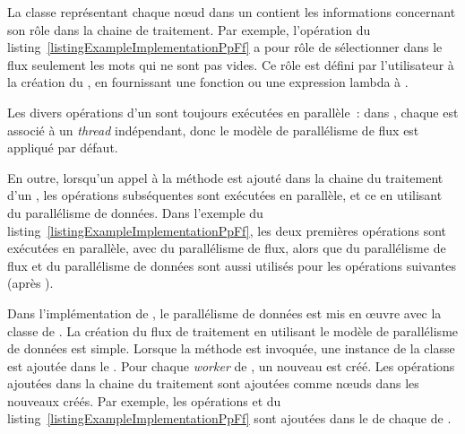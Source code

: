 La classe repr\'esentant chaque nœud dans un  contient les informations concernant son r\^ole dans la chaine de traitement. Par exemple, l'op\'eration  du listing~\ref{listingExampleImplementationPpFf} a pour r\^ole de s\'electionner dans le flux seulement les mots qui ne sont pas vides. Ce r\^ole est d\'efini par l'utilisateur \`a la cr\'eation du , en fournissant une fonction ou une expression lambda \`a .


Les divers op\'erations d'un  sont toujours ex\'ecut\'ees en parall\`ele~: dans , chaque  est associ\'e \`a un \emph{thread} ind\'ependant, donc le mod\`ele de parall\'elisme de flux est appliqu\'e par d\'efaut. 

En outre, lorsqu'un appel \`a la m\'ethode  est ajout\'e dans la chaine du traitement d'un , les op\'erations subs\'equentes sont ex\'ecut\'ees en parall\`ele, et ce en utilisant du parall\'elisme de donn\'ees. Dans l'exemple du listing~\ref{listingExampleImplementationPpFf}, les deux premi\`eres op\'erations sont ex\'ecut\'ees en parall\`ele, avec du parall\'elisme de flux, alors que du parall\'elisme de flux et du parall\'elisme de donn\'ees sont aussi utilis\'es pour les op\'erations suivantes (apr\`es ). 

Dans l'impl\'ementation de , le parall\'elisme de donn\'ees est mis en œuvre avec la classe  de . La cr\'eation du flux de traitement en utilisant le mod\`ele de parall\'elisme de donn\'ees est simple. Lorsque la m\'ethode  est invoqu\'ee, une instance de la classe  est ajout\'ee dans le . Pour chaque \emph{worker} de , un nouveau  est cr\'e\'e. Les op\'erations ajout\'ees dans la chaine du traitement  sont ajout\'ees comme nœuds dans les nouveaux  cr\'e\'es. Par exemple, les op\'erations  et  du listing~\ref{listingExampleImplementationPpFf} sont ajout\'ees dans le  de chaque  de . 


